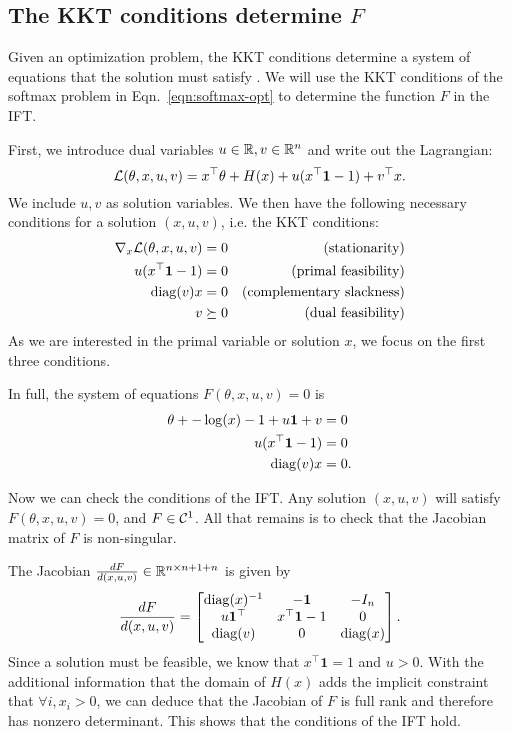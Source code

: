 \documentclass[11pt]{article}
\begin{document}
\subsection{The KKT conditions determine $F$}
Given an optimization problem, the KKT conditions determine a system of equations
that the solution must satisfy \citep{kkt-thesis,kkt}.
We will use the KKT conditions of the softmax problem in
Eqn.~\ref{eqn:softmax-opt} to determine the function $F$ in the IFT.

First, we introduce dual variables $u\in\mathbb{R},v\in\mathbb{R}^n$ and write out the Lagrangian:
$$\mathcal{L}(\theta, x, u, v) = x^\top\theta + H(x) + u(x^\top \mathbf{1} - 1) + v^\top x.$$
We include $u,v$ as solution variables.
We then have the following necessary conditions for a solution $(x,u,v)$,
i.e. the KKT conditions:
\begin{equation}
\begin{aligned}
\nabla_x \mathcal{L}(\theta, x,u,v) = 0 && \textrm{(stationarity)}\\
u(x^{\top} \mathbf{1} - 1) = 0 && \textrm{(primal feasibility)}\\
\mathrm{diag}(v)x = 0 && \textrm{(complementary slackness)}\\
v \succeq 0 && \textrm{(dual feasibility)}
\end{aligned}
\end{equation}
As we are interested in the primal variable or solution $x$,
we focus on the first three conditions.

In full, the system of equations $F(\theta, x,u,v) = 0$ is
\begin{equation}
\label{eqn:system}
\begin{aligned}
\theta + -\log(x) - 1 + u\mathbf{1} + v &= 0\\
u(x^{\top} \mathbf{1} - 1) &= 0\\
\mathrm{diag}(v)x &= 0.
\end{aligned}
\end{equation}

Now we can check the conditions of the IFT.
Any solution $(x,u,v)$ will satisfy $F(\theta, x,u,v) = 0$,
and $F \in \mathcal{C}^1$.
All that remains is to check that the Jacobian matrix of $F$ is non-singular.

The Jacobian $\frac{dF}{d(x,u,v)}\in\mathbb{R}^{n\times n+1+n}$ is given by
\begin{equation}
\label{eqn:f-jac}
\frac{dF}{d(x,u,v)}=
\begin{bmatrix}
\mathrm{diag}(x)^{-1} & -\mathbf{1} & -I_n \\
u\mathbf{1}^\top & x^\top\mathbf{1} - 1 & 0\\
\mathrm{diag}(v) & 0 & \mathrm{diag}(x)
\end{bmatrix}.
\end{equation}
Since a solution must be feasible, we know that $x^\top\mathbf{1} = 1$ and $u > 0$.
With the additional information that the domain of $H(x)$
adds the implicit constraint that $\forall i, x_i > 0$,
we can deduce that the Jacobian of $F$ is full rank and therefore has nonzero determinant.
This shows that the conditions of the IFT hold.
\end{document}
